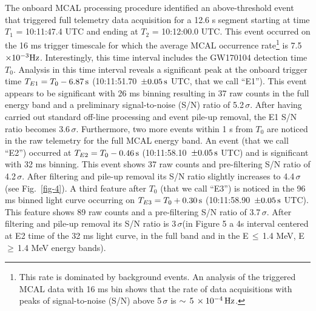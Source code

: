 \documentclass[preprint2]{aastex}
\def\gw {GW170104 }
\def \fv {}
\def \fvvv {}
\begin{document}
The onboard MCAL processing procedure identified an
above-threshold event that triggered full telemetry data
acquisition for a 12.6 s segment starting at time $T_{1}$
= 10:11:47.4 UTC and ending at $T_2$ = 10:12:00.0 UTC.
{\fv This event occurred on the 16 ms trigger timescale for which the
average MCAL occurrence rate\footnote[3]{This rate is dominated by background events. An analysis of the triggered MCAL data with 16 ms bin
shows that the rate of data acquisitions with peaks of signal-to-noise (S/N) above 5\,$\sigma$ is $\sim\,5\,\times 10^{-4} \,\rm Hz$.} is 7.5\,$\times 10^{-3} \rm Hz$.}
Interestingly, this time interval includes the \gw {\fv detection} time
$T_0$.
%
%
 Analysis in this time interval reveals a significant
peak at the onboard trigger time $T_{E1} = T_0 - 6.87 \rm \, s$ (10:11:51.70\, $\pm 0.05
\, \rm s$ UTC, that we call ``E1'').
%
This event {\fv {\fvvv appears to be significant with} 26 ms binning}
{\fv resulting in} 37 raw counts in the full {\fv energy} band
and a preliminary signal-to-noise (S/N) ratio of 5.2\,$\sigma$.
After having carried out standard off-line processing and event
pile-up removal, the E1 S/N ratio becomes $3.6 \, \sigma$.
%
%
Furthermore, two more events within 1 s from $T_0$ are 
{\fv noticed} in the raw telemetry for the full MCAL energy band.
{\fv An event} (that we call ``E2'') occurred at
$T_{E2} = T_0 - 0.46 \, \rm s$ (10:11:58.10\, $\pm 0.05 \,
\rm s$ UTC) {\fv and {\fvvv is significant with} 32 ms binning. This
event shows 37 raw counts and pre-filtering {\fvvv S/N} ratio
of 4.2\,$\sigma$. After filtering and pile-up removal its S/N ratio
slightly increases to 4.4\,$\sigma$ (see Fig.~\ref{fig-4}). A third feature after $T_0$
(that we call ``E3'') is noticed in the 96 ms binned light curve
occurring on $T_{E3} = T_0 + 0.30 \, \rm s$
(10:11:58.90\, $\pm 0.05 \, \rm s$ UTC). This feature shows 89 raw
counts and a pre-filtering {\fvvv S/N} ratio
of 3.7\,$\sigma$. After filtering and pile-up removal its S/N
ratio is 3\,$\sigma$(in Figure 5 a 4s  interval centered at E2 time of the 32 ms light curve, in the full band and in the E\,$\leq$\,1.4 MeV, E\,$\geq$\,1.4 MeV energy bands).}
\end{document}
